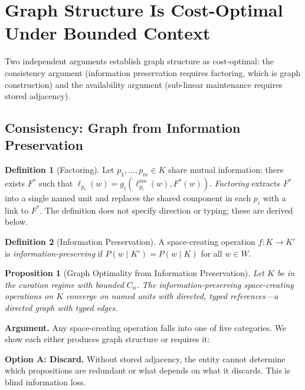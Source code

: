 \documentclass[11pt]{article}
\newtheorem{proposition}{Proposition}
\theoremstyle{definition}
\newtheorem{definition}{Definition}
\theoremstyle{remark}
\begin{document}
\section{Graph Structure Is Cost-Optimal Under Bounded Context}
\label{sec:graph}

Two independent arguments establish graph structure as cost-optimal:
the consistency argument (information preservation requires factoring,
which is graph construction) and the availability argument (sub-linear
maintenance requires stored adjacency).

\subsection{Consistency: Graph from Information Preservation}

\begin{definition}[Factoring]
\label{def:factoring}
Let $p_1, \ldots, p_m \in K$ share mutual information: there exists
$F^*$ such that $\ell_{p_i}(w) = g_i(\ell_{p_i}^{\text{res}}(w), F^*(w))$.
\emph{Factoring} extracts $F^*$ into a single named unit and replaces
the shared component in each $p_i$ with a link to $F^*$. The definition
does not specify direction or typing; these are derived below.
\end{definition}

\begin{definition}[Information Preservation]
\label{def:preservation}
A space-creating operation $f : K \to K'$ is \emph{information-preserving}
if $P(w \mid K') = P(w \mid K)$ for all $w \in W$.
\end{definition}

\begin{proposition}[Graph Optimality from Information Preservation]
\label{thm:graph-info}
Let $K$ be in the curation regime with bounded $C_n$. The
information-preserving space-creating operations on $K$ converge on
named units with directed, typed references---a directed graph with
typed edges.
\end{proposition}

\textbf{Argument.} Any space-creating operation falls into one of five
categories. We show each either produces graph structure or requires it:

\textbf{Option A: Discard.} Without stored adjacency, the entity cannot
determine which propositions are redundant or what depends on what it
discards. This is blind information loss.
\end{document}
